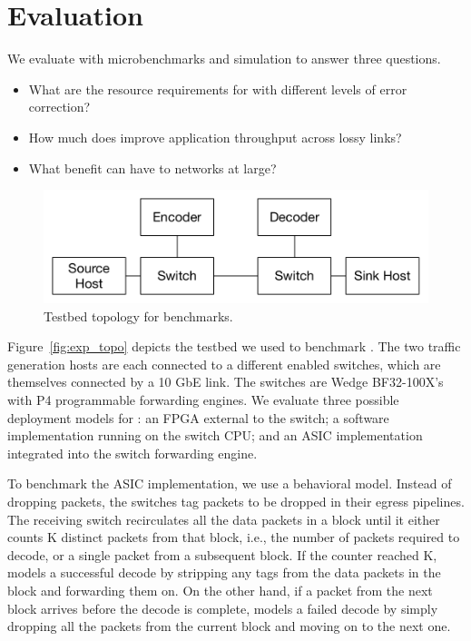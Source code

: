 \section{Evaluation}

We evaluate \OurSys with microbenchmarks and simulation to answer three questions.
\begin{itemize}

\item What are the resource requirements for \OurSys with different levels of 
error correction?

\item How much does \OurSys improve application throughput across lossy links?

\item What benefit can \OurSys have to networks at large?
\end{itemize}

\begin{figure}
  \centering
  \includegraphics[width=0.3\paperwidth]{exp_topo.pdf}
  \caption{\label{fig:format} Testbed topology for benchmarks.}
\end{figure}

Figure~\ref{fig:exp_topo} depicts the testbed we used to benchmark \OurSys.
The two traffic generation hosts are each connected to a different \OurSys
enabled switches, which are themselves connected by a 10 GbE link. The
switches are Wedge BF32-100X's with P4 programmable forwarding engines. We
evaluate three possible deployment models for \OurSys: an FPGA external to
the switch; a software implementation running on the switch CPU; and an ASIC  
implementation integrated into the switch forwarding engine. 

To benchmark the ASIC implementation, we use a behavioral model. Instead  of
dropping packets, the switches tag packets to be dropped in their  egress
pipelines. The receiving switch recirculates all the data packets in a block 
until it either counts K distinct packets from that block, i.e., the number of packets 
required to decode, or a single packet from a subsequent block. If the counter 
reached K, \OurSys models a successful decode by stripping any tags from the 
data packets in the block and forwarding them on. On the other hand, if 
a packet from the next block arrives before the decode is complete, \OurSys 
models a failed decode by simply dropping all the packets from the current 
block and moving on to the next one. 

